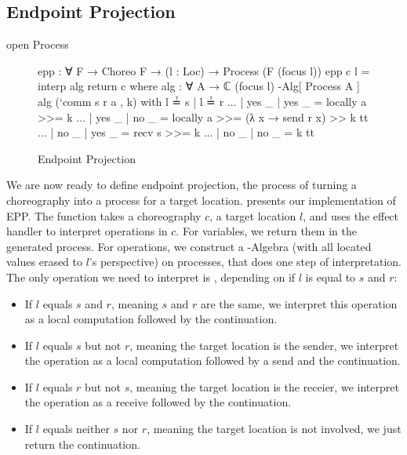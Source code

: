 \subsection{Endpoint Projection} \label{sec:epp}

\begin{code}[hide]
open Process
\end{code}

\begin{figure}[ht]
\begin{code}
epp : ∀ {F} → Choreo F → (l : Loc) → Process (F (focus l))
epp c l = interp alg return c
  where
    alg : ∀ {A} → ℂ (focus l) -Alg[ Process A ]
    alg (`comm s r a , k) with l ≟ s | l ≟ r
    ... | yes _  | yes _  = locally a >>= k
    ... | yes _  | no  _  = locally a >>= (λ x → send r x) >> k tt
    ... | no  _  | yes _  = recv s >>= k
    ... | no  _  | no  _  = k tt
\end{code}
\caption{Endpoint Projection}
\label{fig:epp}
\end{figure}

We are now ready to define endpoint projection, the process of turning a choreography into a process for a target location.
%
 presents our implementation of EPP.
%
The function  takes a choreography $c$, a target location $l$, and uses the effect handler  to interpret operations in $c$.
%
For variables, we return them in the generated process.
%
For operations, we construct a -Algebra (with all located values erased to $l$'s perspective)  on processes, that does one step of interpretation.
%
The only operation we need to interpret is , depending on if $l$ is equal to $s$ and $r$:
%
\begin{itemize}
\item
  If $l$ equals $s$ and $r$, meaning $s$ and $r$ are the same, we interpret this operation as a local computation followed by the continuation.
\item
  If $l$ equals $s$ but not $r$, meaning the target location is the sender, we interpret the operation as a local computation followed by a send and the continuation.
\item
  If $l$ equals $r$ but not $s$, meaning the target location is the receier, we interpret the operation as a receive followed by the continuation.
\item
  If $l$ equals neither $s$ nor $r$, meaning the target location is not involved, we just return the continuation.
\end{itemize}
